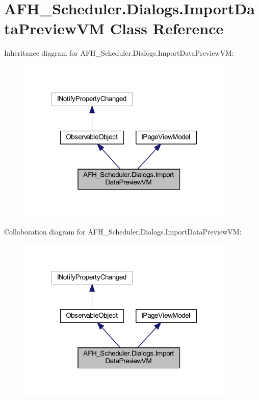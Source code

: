 \section{A\+F\+H\+\_\+\+Scheduler.\+Dialogs.\+Import\+Data\+Preview\+VM Class Reference}
\label{class_a_f_h___scheduler_1_1_dialogs_1_1_import_data_preview_v_m}


Inheritance diagram for A\+F\+H\+\_\+\+Scheduler.\+Dialogs.\+Import\+Data\+Preview\+VM\+:
\nopagebreak
\begin{figure}[H]
\begin{center}
\leavevmode
\includegraphics[width=293pt]{class_a_f_h___scheduler_1_1_dialogs_1_1_import_data_preview_v_m__inherit__graph}
\end{center}
\end{figure}


Collaboration diagram for A\+F\+H\+\_\+\+Scheduler.\+Dialogs.\+Import\+Data\+Preview\+VM\+:
\nopagebreak
\begin{figure}[H]
\begin{center}
\leavevmode
\includegraphics[width=293pt]{class_a_f_h___scheduler_1_1_dialogs_1_1_import_data_preview_v_m__coll__graph}
\end{center}
\end{figure}
